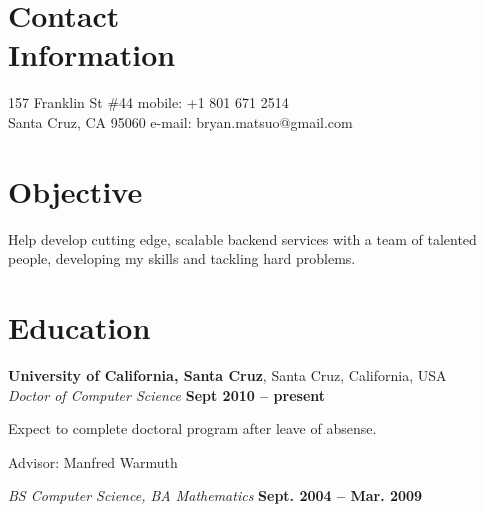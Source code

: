 \documentclass[margin,line]{resume}
\begin{document}
\begin{resume}

    \section{\mysidestyle Contact\\Information}

    157 Franklin St \#44            \hfill mobile: +1 801 671 2514         \vspace{0mm}\\\vspace{0mm}%
    Santa Cruz, CA 95060            \hfill e-mail: bryan.matsuo@gmail.com   \vspace{0mm}\\\vspace{-4.5mm}%


    \section{\mysidestyle Objective}

    Help develop cutting edge, scalable backend services with a team of talented people, developing my skills and
    tackling hard problems.


    \section{\mysidestyle Education}

    \textbf{University of California, Santa Cruz}, Santa Cruz, California, USA \vspace{2mm}\\\vspace{1mm}%
    \textsl{Doctor of Computer Science} \hfill \textbf{ Sept 2010 -- present}\vspace{-3mm}\\\vspace{-1mm}%
    \begin{list2}
        \item Expect to complete doctoral program after leave of absense.
        \item Advisor:  Manfred Warmuth
    \end{list2}\vspace{-1.5mm}
    \textsl{BS Computer Science, BA Mathematics} \hfill \textbf{Sept. 2004 -- Mar. 2009}\vspace{-3mm}\\\vspace{-1mm}%



\end{resume}
\end{document}
